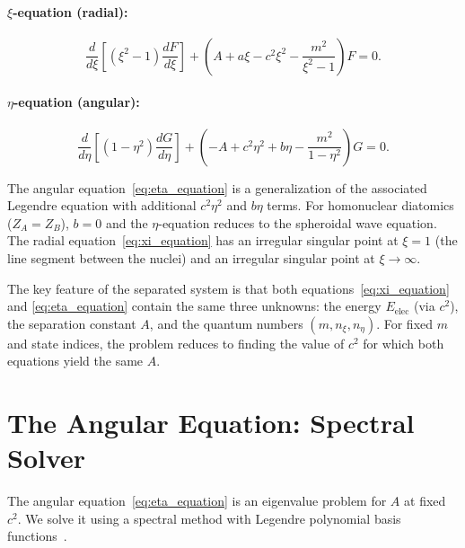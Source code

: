 \documentclass[aps,pra,twocolumn,superscriptaddress,longbibliography]{revtex4-2}
\begin{document}
\paragraph{$\xi$-equation (radial):}
\begin{equation}
  \frac{d}{d\xi}\!\left[(\xi^2 - 1)\frac{dF}{d\xi}\right]
  + \left(A + a\xi - c^2\xi^2 - \frac{m^2}{\xi^2 - 1}\right)F = 0.
  \label{eq:xi_equation}
\end{equation}

\paragraph{$\eta$-equation (angular):}
\begin{equation}
  \frac{d}{d\eta}\!\left[(1 - \eta^2)\frac{dG}{d\eta}\right]
  + \left(-A + c^2\eta^2 + b\eta - \frac{m^2}{1 - \eta^2}\right)G = 0.
  \label{eq:eta_equation}
\end{equation}

The angular equation~\eqref{eq:eta_equation} is a generalization of
the associated Legendre equation with additional $c^2\eta^2$ and
$b\eta$ terms.  For homonuclear diatomics ($Z_A = Z_B$), $b = 0$ and
the $\eta$-equation reduces to the spheroidal wave equation.  The
radial equation~\eqref{eq:xi_equation} has an irregular singular
point at $\xi = 1$ (the line segment between the nuclei) and an
irregular singular point at $\xi \to \infty$.

The key feature of the separated system is that both
equations~\eqref{eq:xi_equation} and \eqref{eq:eta_equation}
contain the same three unknowns: the energy $E_{\mathrm{elec}}$
(via $c^2$), the separation constant $A$, and the quantum numbers
$(m, n_\xi, n_\eta)$.  For fixed $m$ and state indices, the problem
reduces to finding the value of $c^2$ for which both equations yield
the same $A$.


\section{The Angular Equation: Spectral Solver}
\label{sec:angular}

The angular equation~\eqref{eq:eta_equation} is an eigenvalue problem
for $A$ at fixed $c^2$.  We solve it using a spectral method with
Legendre polynomial basis functions~\cite{Flammer1957}.
\end{document}

